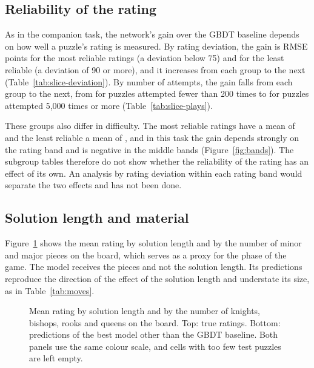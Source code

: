 \documentclass[11pt]{article}
\begin{document}
\begin{table}[htbp]\centering\footnotesize
{}
\caption{Test-set results by whether the solution ends in mate, which no
model receives.}
\label{tab:mate}
\end{table}

\subsection{Reliability of the rating}

As in the companion task, the network's gain over the GBDT baseline depends
on how well a puzzle's rating is measured. By rating deviation, the gain is
 RMSE points for the most reliable ratings (a
deviation below 75) and  for the least reliable
(a deviation of 90 or more), and it increases from each group to the next
(Table~\ref{tab:slice-deviation}). By number of attempts, the gain falls from
each group to the next, from  for puzzles attempted
fewer than 200 times to  for puzzles attempted
5{,}000 times or more (Table~\ref{tab:slice-plays}).

These groups also differ in difficulty. The most reliable ratings have a
mean of  and the least reliable a mean of
, and in this task the gain depends strongly
on the rating band and is negative in the middle bands
(Figure~\ref{fig:bands}). The subgroup tables therefore do not show whether
the reliability of the rating has an effect of its own. An analysis by rating
deviation within each rating band would separate the two effects and has not
been done.

\subsection{Solution length and material}

Figure~\ref{fig:grid} shows the mean rating by solution length and by the
number of minor and major pieces on the board, which serves as a proxy for
the phase of the game. The model receives the pieces and not the solution
length. Its predictions reproduce the direction of the effect of the
solution length and understate its size, as in Table~\ref{tab:moves}.

\begin{figure}[htbp]\centering
{}

\medskip
{}
\caption{Mean rating by solution length and by the number of knights,
bishops, rooks and queens on the board. Top: true ratings. Bottom:
predictions of the best model other than the GBDT baseline. Both panels use
the same colour scale, and cells with too few test puzzles are left empty.}
\label{fig:grid}
\end{figure}
\end{document}
